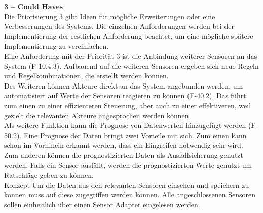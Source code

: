 \textbf{3 – Could Haves}\\
Die Priorisierung 3 gibt Ideen für mögliche Erweiterungen oder eine Verbesserungen des Systems. Die einzelnen Anforderungen werden bei der Implementierung der restlichen Anforderung beachtet, um eine mögliche spätere Implementierung zu vereinfachen.\\
Eine Anforderung mit der Priorität 3 ist die Anbindung weiterer Sensoren an das System (F-10.4.3). Aufbauend auf die weiteren Sensoren ergeben sich neue Regeln und Regelkombinationen, die erstellt werden können.\\
Des Weiteren können Akteure direkt an das System angebunden werden, um automatisiert auf Werte der Sensoren reagieren zu können (F-40.2). Das führt zum einen zu einer effizienteren Steuerung, aber auch zu einer effektiveren, weil gezielt die relevanten Akteure angesprochen werden können.\\
Als weitere Funktion kann die Prognose von Datenwerten hinzugefügt werden (F-50.2). Eine Prognose der Daten bringt zwei Vorteile mit sich. Zum einen kann schon im Vorhinein erkannt werden, dass ein Eingreifen notwendig sein wird. Zum anderen können die prognostizierten Daten als Ausfallsicherung genutzt werden. Falls ein Sensor ausfällt, werden die prognostizierten Werte genutzt um Ratschläge geben zu können.\\
Konzept
Um die Daten aus den relevanten Sensoren einsehen und speichern zu können muss auf diese zugegriffen werden können. Alle angeschlossenen Sensoren sollen einheitlich über einen Sensor Adapter eingelesen werden.

